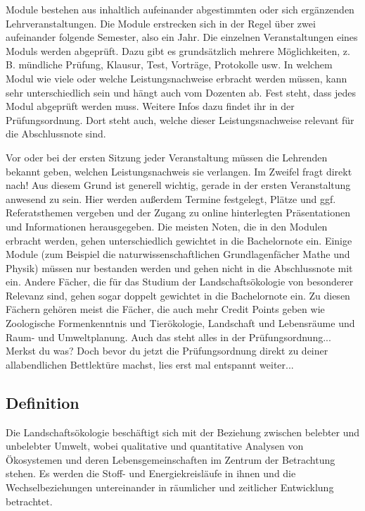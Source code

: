 Module bestehen aus inhaltlich aufeinander abgestimmten oder sich ergänzenden Lehrveranstaltungen. Die Module erstrecken sich in der Regel über zwei aufeinander folgende Semester, also ein Jahr. Die einzelnen Veranstaltungen eines Moduls werden abgeprüft. Dazu gibt es grundsätzlich mehrere Möglichkeiten, z. B. mündliche Prüfung, Klausur, Test, Vorträge, Protokolle usw. In welchem Modul wie viele oder welche Leistungsnachweise erbracht werden müssen, kann sehr unterschiedlich sein und hängt auch vom Dozenten ab. Fest steht, dass jedes Modul abgeprüft werden muss. Weitere Infos dazu findet ihr in der Prüfungsordnung. Dort steht auch, welche dieser Leistungsnachweise relevant für die Abschlussnote sind.

Vor oder bei der ersten Sitzung jeder Veranstaltung müssen die Lehrenden bekannt geben, welchen Leistungsnachweis sie verlangen. Im Zweifel fragt direkt nach! Aus diesem Grund ist generell wichtig, gerade in der ersten Veranstaltung anwesend zu sein. Hier werden außerdem Termine festgelegt, Plätze und ggf. Referatsthemen vergeben und der Zugang zu online hinterlegten Präsentationen und Informationen herausgegeben. 
Die meisten Noten, die in den Modulen erbracht werden, gehen unterschiedlich gewichtet in die Bachelornote ein. Einige Module (zum Beispiel die naturwissenschaftlichen Grundlagenfächer Mathe und Physik) müssen nur bestanden werden und gehen nicht in die Abschlussnote mit ein. Andere Fächer, die für das Studium der Landschaftsökologie von besonderer Relevanz sind, gehen sogar doppelt gewichtet in die Bachelornote ein. Zu diesen Fächern gehören meist die Fächer, die auch mehr Credit Points geben wie Zoologische Formenkenntnis und Tierökologie, Landschaft und Lebensräume und Raum- und Umweltplanung. Auch das steht alles in der Prüfungsordnung... Merkst du was? Doch bevor du jetzt die Prüfungsordnung direkt zu deiner allabendlichen Bettlektüre machst, lies erst mal entspannt weiter...

\subsection*{Definition}
Die Landschaftsökologie beschäftigt sich mit der Beziehung zwischen belebter und unbelebter Umwelt, wobei qualitative und quantitative Analysen von Ökosystemen und deren Lebensgemeinschaften im Zentrum der Betrachtung stehen. Es werden die Stoff- und Energiekreisläufe in ihnen und die Wechselbeziehungen untereinander in räumlicher und zeitlicher Entwicklung betrachtet.

